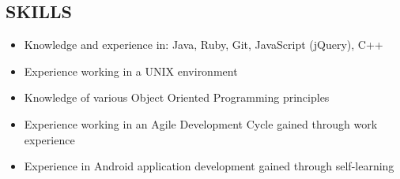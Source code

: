 \documentclass[margin]{res}
\begin{document}
\begin{resume}
\section{SKILLS}
	\begin{itemize}\itemsep -2pt
		\item Knowledge and experience in: Java, Ruby, Git, JavaScript (jQuery), C++
		\item Experience working in a UNIX environment  
		\item Knowledge of various Object Oriented Programming principles
		\item Experience working in an Agile Development Cycle gained through work experience
		\item Experience in Android application development gained through self-learning
\end{itemize}
\end{resume}
\end{document}

